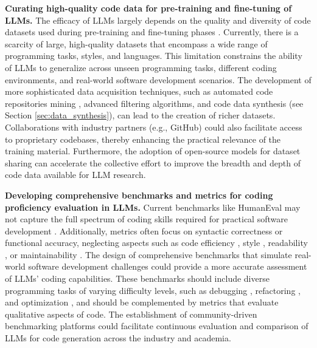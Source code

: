 \textbf{Curating high-quality code data for pre-training and fine-tuning of LLMs.}
The efficacy of LLMs largely depends on the quality and diversity of code datasets used during pre-training and fine-tuning phases \cite{zhou2024lima,kopf2024openassistant,wettig2024qurating}. Currently, there is a scarcity of large, high-quality datasets that encompass a wide range of programming tasks, styles, and languages. This limitation constrains the ability of LLMs to generalize across unseen programming tasks, different coding environments, and real-world software development scenarios.
The development of more sophisticated data acquisition techniques, such as automated code repositories mining \cite{linstead2007mining}, advanced filtering algorithms, and code data synthesis \cite{liu2024best} (see Section \ref{sec:data_synthesis}), can lead to the creation of richer datasets. Collaborations with industry partners (e.g., GitHub) could also facilitate access to proprietary codebases, thereby enhancing the practical relevance of the training material. Furthermore, the adoption of open-source models for dataset sharing can accelerate the collective effort to improve the breadth and depth of code data available for LLM research.

\textbf{Developing comprehensive benchmarks and metrics for coding proficiency evaluation in LLMs.}
Current benchmarks like HumanEval may not capture the full spectrum of coding skills required for practical software development \cite{ni2023l2ceval}. Additionally, metrics often focus on syntactic correctness or functional accuracy, neglecting aspects such as code efficiency \cite{peitek2021program}, style \cite{chen2023duetcs}, readability \cite{buse2009learning}, or maintainability \cite{ardito2020tool}.
The design of comprehensive benchmarks that simulate real-world software development challenges could provide a more accurate assessment of LLMs' coding capabilities. These benchmarks should include diverse programming tasks of varying difficulty levels, such as debugging \cite{zhong2024ldb}, refactoring \cite{shirafuji2023refactoring}, and optimization \cite{ishida2024langprop}, and should be complemented by metrics that evaluate qualitative aspects of code. The establishment of community-driven benchmarking platforms could facilitate continuous evaluation and comparison of LLMs for code generation across the industry and academia.

